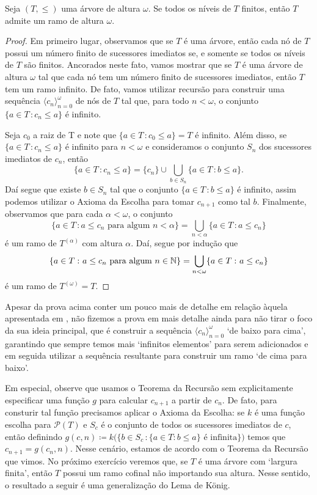 \documentclass[a4paper]{article}
\begin{document}
  \begin{teo}
  Seja \((T,\leq)\) uma árvore de altura \(\omega\). Se todos os níveis de \(T\) finitos, então
  \(T\) admite um ramo de altura \(\omega\).
  \end{teo}
\begin{proof}
  Em primeiro lugar, observamos que se  \(T\) é uma árvore, então cada nó de \(T\) possui
  um número finito de sucessores imediatos se, e somente se todos os níveis de
  \(T\) são finitos. Ancorados neste fato, vamos mostrar que se \(T\) é uma
  árvore de altura \(\omega\) tal que cada nó tem um número finito de sucessores
  imediatos,  então \(T\) tem um ramo infinito. De fato, vamos utilizar recursão
  para  construir uma sequência \(\langle c_n\rangle_{n=0}^{\omega}\)  de nós de
  \(T\) tal que, para todo \(n<\omega\), o conjunto \(\{a\in T\,\colon c_n\leq a\}\) é
  infinito.

  Seja \(c_0\) a raiz de T e  note que \(\{a \in T\,\colon c_{0} \leq a \}= T\)
  é infinito. Além disso, se \(\{a\in T\,\colon c_n\leq a\}\) é infinito para
  \(n<\omega\) e consideramos  o
  conjunto \(S_n\) dos sucessores imediatos de \(c_n\), então
  \[
  \{a\in T\,\colon c_n\leq a\} = \{c_n\} \cup\bigcup_{b\in S_n} \{a\in T\,\colon b\leq a\}.
  \]
 Daí segue que existe \(b\in S_n\) tal que o conjunto \(\{a\in T\,\colon
 b\leq a\}\) é infinito, assim podemos utilizar o Axioma da Escolha para
 tomar \(c_{n+1}\) como tal \(b\). 
 Finalmente, observamos que para cada \(\alpha<\omega\), o conjunto
 \[\{a\in T\,\colon  a\leq c_n \text{ para algum }
   n<\alpha\}=\bigcup_{n<\alpha}\{a\in T\,\colon a\leq c_n\}\] é
  um ramo de \(T^{(\alpha)}\) com altura \(\alpha\). Daí,
  segue por indução que \[\{a\in T\,\colon a\leq c_n \text{ para algum }
    n\in\mathbb{N}\}=\bigcup_{n <\omega}\{a\in T\,\colon a\leq c_n\}\]
  é um ramo de \(T^{(\omega)}=T\).
  \end{proof}

    Apesar da prova acima conter um pouco mais de detalhe em relação àquela
    apresentada em \cite{jech}, não fizemos a prova em mais detalhe ainda para
    não tirar o foco da sua ideia principal, que é construir a sequência
    \(\langle c_n\rangle_{n=0}^\omega\)  `de baixo para cima', garantindo que
    sempre temos mais `infinitos elementos' para serem adicionados e em seguida
    utilizar a sequência resultante para construir um ramo `de cima para baixo'.

    Em especial, observe que usamos o Teorema da Recursão sem
    explicitamente especificar uma função \(g\) para
    calcular \(c_{n+1}\) a partir de \(c_n\). De fato, para consturir tal função precisamos
    aplicar o Axioma da Escolha: se \(k\) é uma função escolha para
    \(\mathcal{P}(T)\) e \(S_c\) é o conjunto de todos os sucessores imediatos
    de \(c\), então definindo \(g(c,n) \coloneqq k\big ( \{b\in S_c\,\colon
    \{a\in T: b\leq a\} \text{ é infinita}\}\big )\) temos que \(c_{n+1} =
    g(c_n, n)\). Nesse  cenário, estamos
    de acordo com o Teorema da Recursão que vimos. No próximo exercício veremos que,
    se \(T\) é uma árvore com `largura finita', então \(T\) possui um ramo
    cofinal não importando sua altura. Nesse sentido, o resultado a seguir é uma
    generalização do Lema de König.
  
\end{document}
